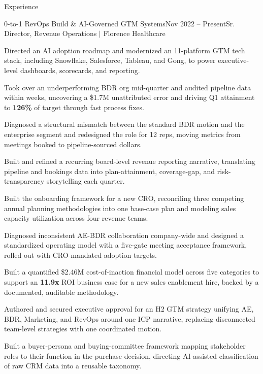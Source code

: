 \documentclass{resume}
\begin{document}
\begin{rSection}{Experience}
\begin{rSubsection}{0-to-1 RevOps Build \& AI-Governed GTM Systems}{\textcolor{black!60}{Nov 2022 -- Present}}{Sr. Director, Revenue Operations $\vert$ Florence Healthcare}{}
\item Directed an AI adoption roadmap and modernized an 11-platform GTM tech stack, including Snowflake, Salesforce, Tableau, and Gong, to power executive-level dashboards, scorecards, and reporting.
\item Took over an underperforming BDR org mid-quarter and audited pipeline data within weeks, uncovering a \$1.7M unattributed error and driving Q1 attainment to \textbf{126\%} of target through fast process fixes.
\item Diagnosed a structural mismatch between the standard BDR motion and the enterprise segment and redesigned the role for 12 reps, moving metrics from meetings booked to pipeline-sourced dollars.
\item Built and refined a recurring board-level revenue reporting narrative, translating pipeline and bookings data into plan-attainment, coverage-gap, and risk-transparency storytelling each quarter.
\item Built the onboarding framework for a new CRO, reconciling three competing annual planning methodologies into one base-case plan and modeling sales capacity utilization across four revenue teams.
\item Diagnosed inconsistent AE-BDR collaboration company-wide and designed a standardized operating model with a five-gate meeting acceptance framework, rolled out with CRO-mandated adoption targets.
\item Built a quantified \$2.46M cost-of-inaction financial model across five categories to support an \textbf{11.9x} ROI business case for a new sales enablement hire, backed by a documented, auditable methodology.
\item Authored and secured executive approval for an H2 GTM strategy unifying AE, BDR, Marketing, and RevOps around one ICP narrative, replacing disconnected team-level strategies with one coordinated motion.
\item Built a buyer-persona and buying-committee framework mapping stakeholder roles to their function in the purchase decision, directing AI-assisted classification of raw CRM data into a reusable taxonomy.
\end{rSubsection}


\end{rSection}
\end{document}
